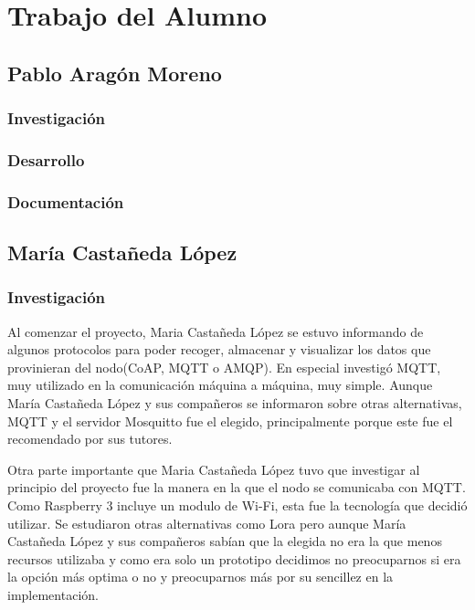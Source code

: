 \cleardoublepage

\chapter{Trabajo del Alumno}
\label{makereference11}

\section{Pablo Aragón Moreno}
\subsection{Investigación}
\subsection{Desarrollo}
\subsection{Documentación}


\section{María Castañeda López}
\subsection{Investigación}

Al comenzar el proyecto, Maria Castañeda López se estuvo informando de algunos protocolos para poder recoger, almacenar y visualizar los datos que provinieran del nodo(CoAP, MQTT o AMQP). En especial investigó MQTT, muy utilizado en la comunicación máquina a máquina, muy simple. Aunque María Castañeda López y sus compañeros se informaron sobre otras alternativas, MQTT y el servidor Mosquitto fue el elegido, principalmente porque este fue el recomendado por sus tutores. 

Otra parte importante que Maria Castañeda López tuvo que investigar al principio del proyecto fue la manera en la que el nodo se comunicaba con MQTT. Como Raspberry 3 incluye un modulo de Wi-Fi, esta fue la tecnología que decidió utilizar. Se estudiaron otras alternativas como Lora pero aunque María Castañeda López y sus compañeros sabían  que la elegida no era la que menos recursos utilizaba y como era solo un prototipo decidimos no preocuparnos si era la opción más optima o no y preocuparnos más por su sencillez en la implementación.


